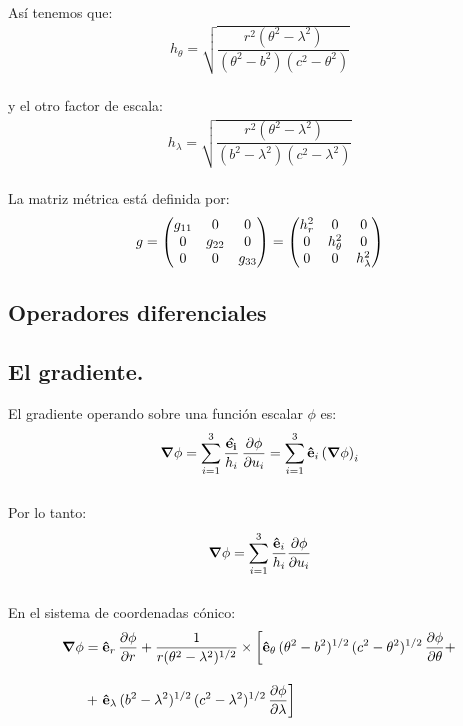 \\
Así tenemos que:
\begin{align*}
h_{\theta} = \sqrt{\dfrac{r^{2} (\theta^{2} - \lambda^{2})}{(\theta^{2} - b^{2})(c^{2} - \theta^{2})}}
\end{align*}
\\
y el otro factor de escala:
\begin{align*}
h_{\lambda} = \sqrt{\dfrac{r^{2} (\theta^{2} - \lambda^{2})}{(b^{2} - \lambda^{2})(c^{2} - \lambda^{2})}}
\end{align*}
\\
La matriz métrica está definida por:
\begin{align*}
g = \mqty(
g_{11} & 0 & 0 \\
0 & g_{22} & 0 \\
0 & 0 & g_{33} \\
) = 
\mqty(
h_{r}^{2} & 0 & 0 \\
0 & h_{\theta}^{2} & 0 \\
0 & 0 & h_{\lambda}^{2}
)
\end{align*}

\subsection{Operadores diferenciales}
\subsection*{El gradiente.}

El gradiente operando sobre una función escalar $\phi$ es:
\begin{align*}
\grad{\phi} = \sum_{i=1}^{3} \dfrac{\vu{e_{i}}}{h_{i}} \, \pdv{\phi}{u_{i}} = \sum_{i=1}^{3} \vu{e}_{i} \left( \grad{\phi} \right)_{i}
\end{align*}
\\
Por lo tanto:
\begin{align*}
\grad{\phi} = \sum_{i=1}^{3} \dfrac{\vu{e}_{i}}{h_{i}} \pdv{\phi}{u_{i}}
\end{align*}
\\
En el sistema de coordenadas cónico:
\begin{align*}
\grad{\phi} &= \vu{e}_{r} \, \pdv{\phi}{r} + \dfrac{1}{r (\theta^{2} - \lambda^{2})^{1/2}} \times \left[ \vu{e}_{\theta} \, (\theta^{2} - b^{2})^{1/2} \, (c^{2} - \theta^{2})^{1/2} \, \pdv{\phi}{\theta} + \right. \\[1em]
&+ \left. \vu{e}_{\lambda} \, (b^{2} - \lambda^{2})^{1/2} \, (c^{2} - \lambda^{2})^{1/2} \, \pdv{\phi}{\lambda} \right]
\end{align*}

